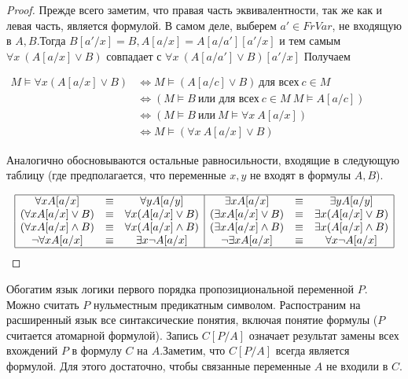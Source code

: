 \begin{proof}
	 Прежде всего заметим, что правая часть эквивалентности, так же как и левая часть, является формулой. В самом
	 деле, выберем $a'\in FrVar$, не входящую в $A,B$.Тогда $B[a'/x]=B,A[a/x]=A[a/a'][a'/x]$ и тем самым $\forall x
	 \:(A[a/x]\lor B)$ совпадает с  $\forall x\:(A[a/a']\lor B)[a'/x]$ Получаем
     \begin{center}
         $\begin{aligned}
    M \vDash \forall x(A[a / x] \vee B) & \Longleftrightarrow M \vDash(A[a / c] \vee B) \ \text{для всех} \ c \in M \\
    & \Longleftrightarrow(M \vDash B \ \text{или для всех} \ c \in M \ M \vDash A[a / c]) \\
    & \Longleftrightarrow(M \vDash B \ \text{или} \ M \vDash \forall x \  A[a / x]) \\
    & \Longleftrightarrow M \vDash (\forall x \  A[a / x] \vee B)
    \end{aligned}$
     \end{center}
	 Аналогично обосновываются остальные равносильности, входящие в следующую таблицу (где предполагается, что
	 переменные $x,y$ не входят в формулы $A, B$).

$$
\begin{array}{|ccc|ccc|}
\hline \forall x A[a / x] & {\equiv} & {\forall y A[a / y]} & {\exists x A[a / x]} & {\equiv} & {\exists y A[a / y]} \\
{(\forall x A[a / x] \vee B)} & {\equiv} & {\forall x(A[a / x] \vee B)} & {(\exists x A[a / x] \vee B)} & {\equiv}
	& {\exists x(A[a / x] \vee B)} \\
{(\forall x A[a / x] \wedge B)} & {\equiv} & {\forall x(A[a / x] \wedge B)} & {(\exists x A[a / x] \wedge B)} &
	{\equiv} & {\exists x(A[a / x] \wedge B)} \\
{\neg \forall x A[a / x]} & {\equiv} & {\exists x \neg A[a / x]} & {\neg \exists x A[a / x]} & {\equiv} & {\forall
	x \neg A[a / x]} \\
\hline
\end{array}
$$
\end{proof}
\begin{definition}
	Обогатим язык логики первого порядка пропозициональной переменной $P$. Можно считать $P$ нульместным
	предикатным символом. Распостраним на расширенный язык все синтаксические понятия, включая понятие формулы ($P$
	считается атомарной формулой). Запись $C[P/A]$ означает результат замены всех вхождений $P$ в формулу $C$ на
	$A$.Заметим, что $C[P/A]$ всегда является формулой. Для этого достаточно, чтобы связанные переменные $A$ не
	входили в $C$.
\end{definition}

